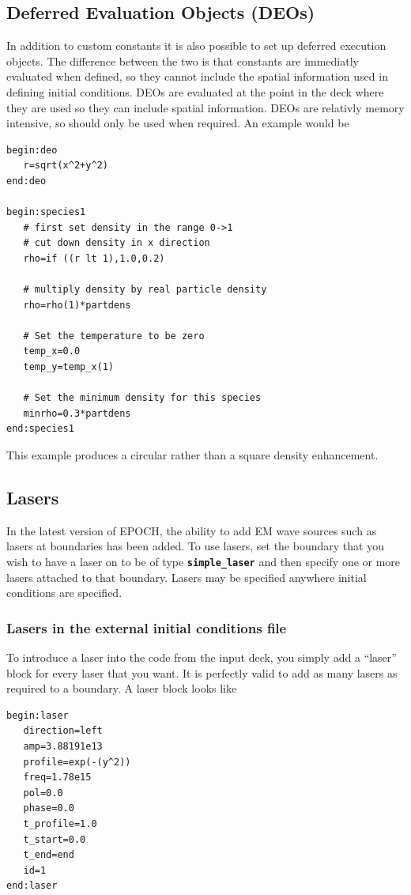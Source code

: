 \documentclass[12pt,a4paper]{article}
\newcommand{\simpleboxverbatim}{\begin{Verbatim}[obeytabs=true,frame=single,
  framerule=0.5mm,rulecolor=\color{warwickmid},formatcom=\color{black}]}
\newcommand{\inlinecode}[1]{{\color{warwickred} \bf\texttt{#1}}}
\begin{document}
\subsection{Deferred Evaluation Objects (DEOs)}
In addition to custom constants it is also possible to set up deferred
execution objects. The difference between the two is that constants are
immediatly evaluated when defined, so they cannot include the spatial
information used in defining initial conditions. DEOs are evaluated at the
point in the deck where they are used so they can include spatial
information. DEOs are relativly memory intensive, so should only be used when
required. An example would be
\simpleboxverbatim
begin:deo
   r=sqrt(x^2+y^2)
end:deo

begin:species1
   # first set density in the range 0->1
   # cut down density in x direction
   rho=if ((r lt 1),1.0,0.2)

   # multiply density by real particle density
   rho=rho(1)*partdens

   # Set the temperature to be zero
   temp_x=0.0
   temp_y=temp_x(1)

   # Set the minimum density for this species
   minrho=0.3*partdens
end:species1
\end{Verbatim}
This example produces a circular rather than a square density enhancement.

\subsection{Lasers}
In the latest version of EPOCH, the ability to add EM wave sources such as
lasers at boundaries has been added. To use lasers, set the boundary that you
wish to have a laser on to be of type \inlinecode{simple\_laser} and then
specify one or more lasers attached to that boundary. Lasers may be specified
anywhere initial conditions are specified.

\subsubsection{Lasers in the external initial conditions file}
To introduce a laser into the code from the input deck, you simply add a
``laser'' block for every laser that you want. It is perfectly valid to add as
many lasers as required to a boundary. A laser block looks like

\simpleboxverbatim
begin:laser
   direction=left
   amp=3.88191e13
   profile=exp(-(y^2))
   freq=1.78e15
   pol=0.0
   phase=0.0
   t_profile=1.0
   t_start=0.0
   t_end=end
   id=1
end:laser
\end{Verbatim}
\end{document}
